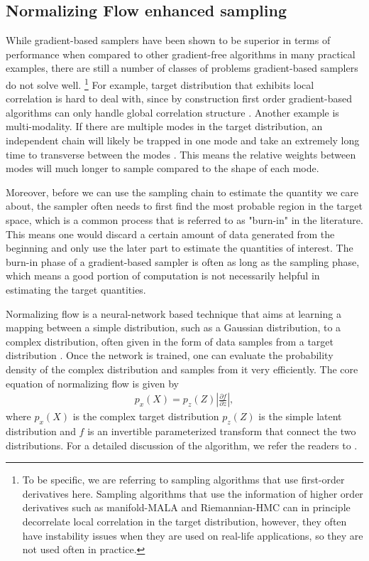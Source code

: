 \documentclass[twocolumn]{aastex631}
\begin{document}
\subsection{Normalizing Flow enhanced sampling}
\label{sec:flow}

While gradient-based samplers have been shown to be superior in terms of
performance when compared to other gradient-free algorithms in many practical
examples, there are still a number of classes of problems gradient-based
samplers do not solve well. \footnote{To be specific, we are referring to
sampling algorithms that use first-order derivatives here. Sampling algorithms
that use the information of higher order derivatives such as manifold-MALA and
Riemannian-HMC \cite{RMHMC} can in principle decorrelate local correlation in
the target distribution, however, they often have instability issues when they
are used on real-life applications, so they are not used often in practice.} For
example, target distribution that exhibits local correlation is hard to deal
with, since by construction first order gradient-based algorithms can only
handle global correlation structure \cite{2017arXiv170102434B}. Another example
is multi-modality. If there are multiple modes in the target distribution, an
independent chain will likely be trapped in one mode and take an extremely long
time to transverse between the modes \cite{2018arXiv180803230M}. This means the
relative weights between modes will much longer to sample compared to the shape
of each mode.

Moreover, before we can use the sampling chain to estimate the quantity we care about,
the sampler often needs to first find the most probable region in the target
space, which is a common process that is referred to as "burn-in" in the
literature. This means one would discard a certain amount of data generated from
the beginning and only use the later part to estimate the quantities of
interest. The burn-in phase of a gradient-based sampler is often as long as the
sampling phase, which means a good portion of computation is not necessarily
helpful in estimating the target quantities.

Normalizing flow is a neural-network based technique that aims at learning a
mapping between a simple distribution, such as a Gaussian distribution, to a
complex distribution, often given in the form of data samples from a target
distribution \cite{2019arXiv190809257K, 2019arXiv191202762P}. Once the network is trained, one can evaluate the probability
density of the complex distribution and samples from it very efficiently.
The core equation of normalizing flow is given by
\begin{align}
    p_x(X) = p_z(Z) \left| \frac{\partial f}{\partial z}\right|,
\end{align}
where $p_x(X)$ is the complex target distribution $p_z(Z)$ is the simple latent
distribution and $f$ is an invertible parameterized transform that
connect the two distributions. For a detailed discussion of the algorithm, we
refer the readers to \cite{2019arXiv190809257K, 2019arXiv191202762P}.
\end{document}
